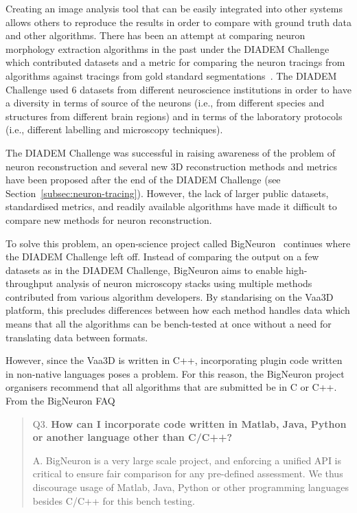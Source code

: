 Creating an image analysis tool that can be easily integrated into
other systems allows others to reproduce the results in order to
compare with ground truth data and other algorithms. There
has been an attempt at comparing neuron morphology extraction
algorithms in the past under the DIADEM Challenge which
contributed datasets and a metric for comparing the neuron
tracings from algorithms against tracings from gold standard
segmentations~\citep{DIADEM&Beyond:Liu:2011,DIADEM-dataset:Brown:2011,DIADEM-metric-Gillette2011}.
The DIADEM Challenge used 6 datasets from different neuroscience
institutions in order to have a diversity in terms of source of
the neurons (i.e., from different species and structures from
different brain regions) and in terms of the laboratory protocols
(i.e., different labelling and microscopy techniques).

The DIADEM Challenge was successful in raising awareness of the
problem of neuron reconstruction and several new 3D reconstruction
methods and metrics have been proposed after the end of the DIADEM
Challenge (see Section~\ref{subsec:neuron-tracing}).  However, the
lack of larger public datasets, standardised metrics, and readily
available algorithms have made it difficult to compare new methods
for neuron reconstruction.

To solve this problem, an open-science project called
BigNeuron~\citep{BigNeuron:Peng:2015,DIADEM2BigNeuron:Peng:2015}
continues where the DIADEM Challenge left off. Instead of
comparing the output on a few datasets as in the DIADEM Challenge,
BigNeuron aims to enable high-throughput analysis of neuron
microscopy stacks using multiple methods contributed from various
algorithm developers. By standarising on the Vaa3D platform, this
precludes differences between how each method handles data which
means that all the algorithms can be bench-tested at once without
a need for translating data between formats.

However, since the Vaa3D is written in C++, incorporating plugin
code written in non-native languages poses a problem. For this
reason, the BigNeuron project organisers recommend that all
algorithms that are submitted be in C or C++. From the BigNeuron
FAQ~\citep{BigNeuron:FAQ:2015}
\begin{quote}
	\begin{fancyquote}
		{Q3. \bfseries How can I incorporate code written in Matlab, Java, Python or another language other than C/C++?}

		A. BigNeuron is a very large scale project, and enforcing a
		unified API is critical to ensure fair comparison for any pre-defined
		assessment. We thus discourage usage of Matlab, Java, Python or other
		programming languages besides C/C++ for this bench
		testing.
	\end{fancyquote}
\end{quote}

